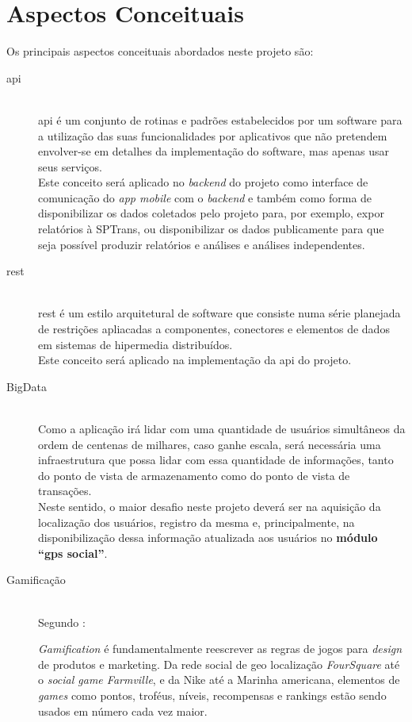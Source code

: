 \chapter{Aspectos Conceituais}\label{chp:aspectosConceituais}
Os principais aspectos conceituais abordados neste projeto são:
\begin{description}
    \item[\gls{api}] \cite{apifoldoc} \hfill \\
        \gls{api} é um conjunto de rotinas e padrões estabelecidos por um software para a utilização das suas funcionalidades por aplicativos que não pretendem envolver-se em detalhes da implementação do software, mas apenas usar seus serviços.\\
        Este conceito será aplicado no \textit{backend} do projeto como interface de comunicação do \textit{app mobile} com o \textit{backend} e também como forma de disponibilizar os dados coletados pelo projeto para, por exemplo, expor relatórios à SPTrans, ou disponibilizar os dados publicamente para que seja possível produzir relatórios e análises e análises independentes.%
%
	\item[\gls{rest}] \cite{Fielding2000} \hfill \\
	    \gls{rest} é um estilo arquitetural de software que consiste numa série planejada de restrições apliacadas a componentes, conectores e elementos de dados em sistemas de hipermedia distribuídos. \\
	    Este conceito será aplicado na implementação da \gls{api} do projeto.%
%
	\item[BigData] \hfill \\
	    Como a aplicação irá lidar com uma quantidade de usuários simultâneos da ordem de centenas de milhares, caso ganhe escala, será necessária uma infraestrutura que possa lidar com essa quantidade de informações, tanto do ponto de vista de armazenamento como do ponto de vista de transações.\\
	    Neste sentido, o maior desafio neste projeto deverá ser na aquisição da localização dos usuários, registro da mesma e, principalmente, na disponibilização dessa informação atualizada aos usuários no \textbf{módulo ``gps social''}.%
%
	\item[Gamificação] \hfill \\
	    Segundo :
	    \begin{citacao}
	    \textit{Gamification} é fundamentalmente reescrever as regras de jogos para \textit{design} de produtos e marketing. Da rede social de geo localização \textit{FourSquare} até o \textit{social game Farmville}, e da Nike até a Marinha americana, elementos de \textit{games} como pontos, troféus, níveis, recompensas e rankings estão sendo usados em número cada vez maior.

\end{citacao}
\end{description}
